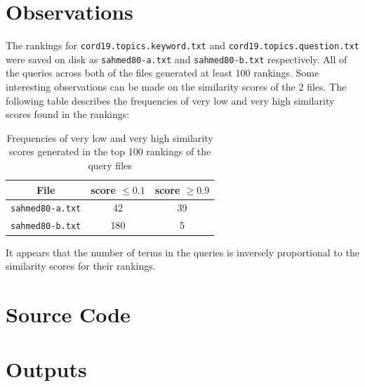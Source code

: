 \documentclass[11pt]{article}
\begin{document}
\section{Observations}
The rankings for \texttt{cord19.topics.keyword.txt} and \texttt{cord19.topics.question.txt} were saved on disk as \texttt{sahmed80-a.txt} and \texttt{sahmed80-b.txt} respectively. All of the queries across both of the files generated at least 100 rankings. Some interesting observations can be made on the similarity scores of the 2 files. The following table describes the frequencies of very low and very high similarity scores found in the rankings:

\begin{table}[!ht]
    \caption{Frequencies of very low and very high similarity scores generated in the top 100 rankings of the query files}
    \begin{center}

        \begin{tabular}{| c | c | c |}
        \hline
        \textbf{File} & \textbf{score $\leq 0.1$} & \textbf{score $\geq 0.9$}
        \\ \hline
        \texttt{sahmed80-a.txt} & 42 & 39
        \\ \hline
        \texttt{sahmed80-b.txt} & 180 & 5
        \\ \hline
        \end{tabular}

    \end{center}

\end{table}

It appears that the number of terms in the queries is inversely proportional to the similarity scores for their rankings.

\newpage
\clearpage

\appendix
{}%

\section{Source Code} \label{appendix:src}



\section{Outputs} \label{appendix:outputs}


\end{document}
